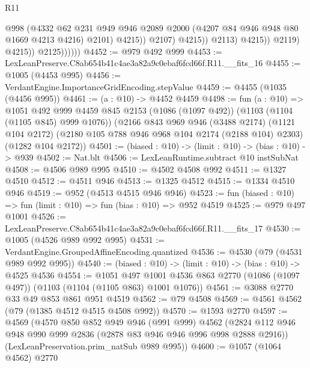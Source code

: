 \begin{lexlean}{R11}
\begin{coremodule}
                                      @998
                                      (@4332
                                        @62
                                        @231
                                        @949
                                        @946
                                        @2089
                                        @2000
                                        (@4207 @84 @946 @948 @80 @1669 @4213 @4216)
                                        @2101)
                                      @4215))
                                  @2107)
                                @4215))
                            @2113)
                          @4215))
                      @2119)
                    @4215))
                @2125))))))
@4452 := @979 @492 @999
@4453 := LexLeanPreserve.C8ab654b41c4ae3a82a9c0ebaf6fcd66f.R11.__fits_16
@4455 := @1005 (@4453 @995)
@4456 := VerdantEngine.ImportanceGridEncoding.stepValue
@4459 := @4455 (@1035 (@4456 @995))
@4461 := (a : @10) -> @4452 @4459
@4498 := fun (a : @10) =>
  @1051
    @492
    @999
    @4459
    @845
    @2153
    (@1086 (@1097 @492))
    (@1103 (@1104 (@1105 @845) @999 @1076))
    (@2166
      @843
      @969
      @946
      (@3488 @2174)
      (@1121 @104 @2172)
      (@2180 @105 @788 @946 @968 @104 @2174 (@2188 @104) @2303)
      (@1282 @104 @2172))
@4501 := (biased : @10) -> (limit : @10) -> (bias : @10) -> @939
@4502 := Nat.blt
@4506 := LexLeanRuntime.subtract @10 instSubNat
@4508 := @4506 @989 @995
@4510 := @4502 @4508 @992
@4511 := @1327 @4510
@4512 := @4511 @946
@4513 := @1325 @4512
@4515 := @1334 @4510 @946
@4519 := @952 (@4513 @4515 @946 @946)
@4523 := fun (biased : @10) => fun (limit : @10) => fun (bias : @10) => @952 @4519
@4525 := @979 @497 @1001
@4526 := LexLeanPreserve.C8ab654b41c4ae3a82a9c0ebaf6fcd66f.R11.__fits_17
@4530 := @1005 (@4526 @989 @992 @995)
@4531 := VerdantEngine.GroupedAffineEncoding.quantized
@4536 := @4530 (@79 (@4531 @989 @992 @995))
@4540 := (biased : @10) -> (limit : @10) -> (bias : @10) -> @4525 @4536
@4554 := @1051
    @497
    @1001
    @4536
    @863
    @2770
    (@1086 (@1097 @497))
    (@1103 (@1104 (@1105 @863) @1001 @1076))
@4561 := @3088 @2770 @33 @49 @853 @861 @951 @4519
@4562 := @79 @4508
@4569 := @4561 @4562 (@79 (@1385 @4512 @4515 @4508 @992))
@4570 := @1593 @2770
@4597 := @4569
    (@4570
      @850
      @852
      @949
      @946
      (@991 @999)
      @4562
      (@2824 @112 @946 @948 @990 @999 @2836 (@2878 @83 @946 @946 @996 @998 @2888 @2916))
      (LexLeanPreservation.prim_natSub @989 @995))
@4600 := @1057 (@1064 @4562) @2770

\end{coremodule}
\end{lexlean}
